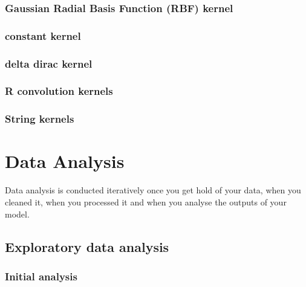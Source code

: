 \documentclass[
]{book}
\begin{document}
\hypertarget{gaussian-radial-basis-function-rbf-kernel}{%
\subsubsection{Gaussian Radial Basis Function (RBF) kernel}\label{gaussian-radial-basis-function-rbf-kernel}}

\hypertarget{constant-kernel}{%
\subsubsection{constant kernel}\label{constant-kernel}}

\hypertarget{delta-dirac-kernel}{%
\subsubsection{delta dirac kernel}\label{delta-dirac-kernel}}

\hypertarget{r-convolution-kernels}{%
\subsubsection{R convolution kernels}\label{r-convolution-kernels}}

\hypertarget{string-kernels}{%
\subsubsection{String kernels}\label{string-kernels}}

\hypertarget{data-analysis}{%
\section{Data Analysis}\label{data-analysis}}

Data analysis is conducted iteratively once you get hold of your data,
when you cleaned it, when you processed it and when you analyse the
outputs of your model.

\hypertarget{exploratory-data-analysis}{%
\subsection{Exploratory data analysis}\label{exploratory-data-analysis}}

\hypertarget{initial-analysis}{%
\subsubsection{Initial analysis}\label{initial-analysis}}
\end{document}
